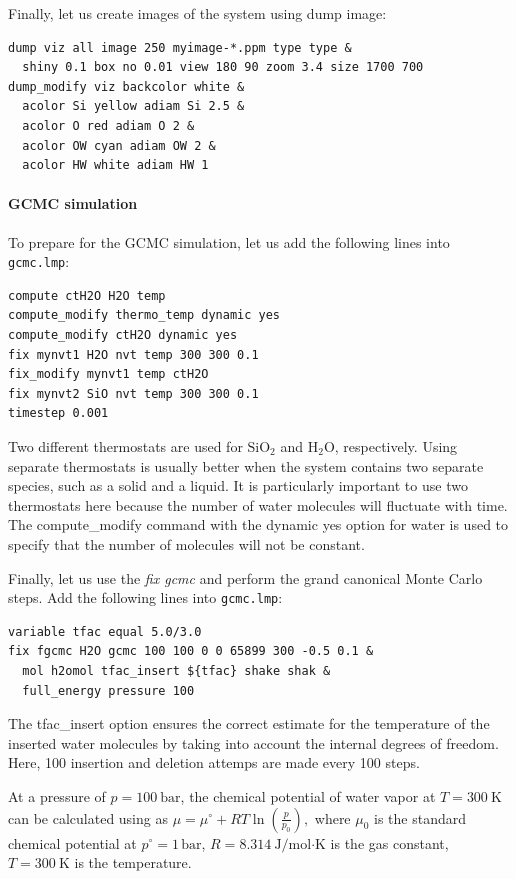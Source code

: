 \documentclass[9pt,tutorial]{livecoms}
\newcommand{\lmpcmd}[1]{\hspace{0pt}\colorbox{listing}{\textcolor{command}{\small{#1}}}\hspace{0pt}} %
\newcommand{\flecmd}[1]{\textcolor{command}{\texttt{#1}}} %
\begin{document}
Finally, let us create images
of the system using \lmpcmd{dump image}:
\begin{lstlisting}
dump viz all image 250 myimage-*.ppm type type &
  shiny 0.1 box no 0.01 view 180 90 zoom 3.4 size 1700 700
dump_modify viz backcolor white &
  acolor Si yellow adiam Si 2.5 &
  acolor O red adiam O 2 &
  acolor OW cyan adiam OW 2 &
  acolor HW white adiam HW 1
\end{lstlisting}

\paragraph{GCMC simulation}

To prepare for the GCMC simulation, let us add the
following lines into \flecmd{gcmc.lmp}:
\begin{lstlisting}
compute ctH2O H2O temp
compute_modify thermo_temp dynamic yes
compute_modify ctH2O dynamic yes
fix mynvt1 H2O nvt temp 300 300 0.1
fix_modify mynvt1 temp ctH2O
fix mynvt2 SiO nvt temp 300 300 0.1
timestep 0.001
\end{lstlisting}
Two different thermostats are used for $\text{SiO}_2$ and $\text{H}_2\text{O}$,
respectively.  Using separate thermostats is usually better when the system contains
two separate species, such as a solid and a liquid.  It is particularly important
to use two thermostats here because the number of water molecules will fluctuate
with time.  The \lmpcmd{compute\_modify} command with the \lmpcmd{dynamic yes}
option for water is used to specify that the number of molecules will not be constant.

Finally, let us use the \textit{fix gcmc} and perform the grand canonical Monte
Carlo steps.  Add the following lines into \flecmd{gcmc.lmp}:
\begin{lstlisting}
variable tfac equal 5.0/3.0 
fix fgcmc H2O gcmc 100 100 0 0 65899 300 -0.5 0.1 &
  mol h2omol tfac_insert ${tfac} shake shak &
  full_energy pressure 100
\end{lstlisting}
The \lmpcmd{tfac\_insert} option ensures the correct estimate for the temperature
of the inserted water molecules by taking into account the internal degrees of
freedom.  Here, 100 insertion and deletion attemps are made every 100 steps.

\begin{note}
At a pressure of $p = 100\ \text{bar}$, the chemical potential of water
vapor at $T = 300\ \text{K}$ can be calculated using as
$\mu = \mu^\circ + RT \ln (\frac{p}{p_0}),$
where $\mu_0$ is the standard chemical potential
at $p^\circ = 1 \, \text{bar}$, \(R = 8.314\ \text{J/mol·K}\) is
the gas constant, \(T = 300\ \text{K}\) is the temperature.
\end{note}
\end{document}
